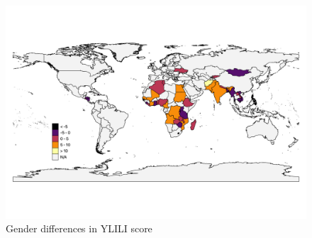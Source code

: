 \documentclass[
  a4paper, twoside, 12pt]{book}
\begin{document}



\newpage



\begin{figure}[H]

{\centering \includegraphics[width=1\linewidth,]{figures/maps/diff_YLILI} 

}

\caption{Gender differences in YLILI score}\label{fig:fig-gendiff}
\end{figure}
\end{document}

